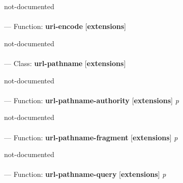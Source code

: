 \begin{adjustwidth}{5em}{5em}
not-documented
\end{adjustwidth}

\paragraph{}
\label{EXTENSIONS:URI-ENCODE}
--- Function: \textbf{uri-encode} [\textbf{extensions}] \textit{}

\begin{adjustwidth}{5em}{5em}
not-documented
\end{adjustwidth}

\paragraph{}
\label{EXTENSIONS:URL-PATHNAME}
--- Class: \textbf{url-pathname} [\textbf{extensions}] \textit{}

\begin{adjustwidth}{5em}{5em}
not-documented
\end{adjustwidth}

\paragraph{}
\label{EXTENSIONS:URL-PATHNAME-AUTHORITY}
--- Function: \textbf{url-pathname-authority} [\textbf{extensions}] \textit{p}

\begin{adjustwidth}{5em}{5em}
not-documented
\end{adjustwidth}

\paragraph{}
\label{EXTENSIONS:URL-PATHNAME-FRAGMENT}
--- Function: \textbf{url-pathname-fragment} [\textbf{extensions}] \textit{p}

\begin{adjustwidth}{5em}{5em}
not-documented
\end{adjustwidth}

\paragraph{}
\label{EXTENSIONS:URL-PATHNAME-QUERY}
--- Function: \textbf{url-pathname-query} [\textbf{extensions}] \textit{p}

